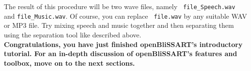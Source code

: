 The result of this procedure will be two wave files, namely {\tt
  file\_Speech.wav} and {\tt file\_Music.wav}. Of course, you can replace {\tt
  file.wav} by any suitable WAV or MP3 file. Try mixing speech and music
together and then separating them using the separation tool like described above.\\

\noindent \textbf{Congratulations, you have just finished openBliSSART's
  introductory tutorial. For an in-depth discussion of openBliSSART's features
  and toolbox, move on to the next sections.}
